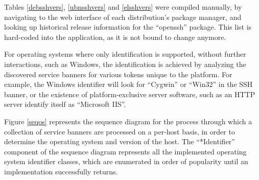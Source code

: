 \documentclass[a4paper,12pt]{article}
\begin{document}
	Tables \ref{debsshvers}, \ref{ubnsshvers} and \ref{elsshvers} were compiled manually, by navigating to the web interface of each distribution's package manager, and looking up historical release information for the ``openssh'' package. This list is hard-coded into the application, as it is not bound to change anymore.
	
	For operating systems where only identification is supported, without further interactions, such as Windows, the identification is achieved by analyzing the discovered service banners for various tokens unique to the platform. For example, the Windows identifier will look for ``Cygwin'' or ``Win32'' in the SSH banner, or the existence of platform-exclusive server software, such as an HTTP server identify itself as ``Microsoft IIS''.
	
	Figure \ref{seqos} represents the sequence diagram for the process through which a collection of service banners are processed on a per-host basis, in order to determine the operating system and version of the host. The ``*Identifier'' component of the sequence diagram represents all the implemented operating system identifier classes, which are enumerated in order of popularity until an implementation successfully returns.
	
\end{document}
